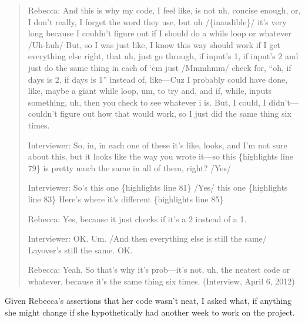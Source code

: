 \begin{quote}
  Rebecca: And this is why my code, I feel like, is not uh, concise enough, or, I don't really, I forget the word they use, but uh /\{inaudible\}/ it's very long because I couldn't figure out if I should do a while loop or whatever /Uh-huh/ But, so I was just like, I know this way should work if I get everything else right, that uh, just go through, if input's 1, if input's 2 and just do the same thing in each of `em just /Mmmhmm/ check for, ``oh, if days is 2, if days is 1'' instead of, like---Cuz I probably could have done, like, maybe a giant while loop, um, to try and, and if, while, inputs something, uh, then you check to see whatever i is. But, I could, I didn't---couldn't figure out how that would work, so I just did the same thing six times.

  Interviewer: So, in, in each one of these it's like, looks, and I'm not sure about this, but it looks like the way you wrote it---so this \{highlights line 79\} is pretty much the same in all of them, right? /Yes/

  Interviewer: So's this one \{highlights line 81\} /Yes/ this one \{highlights line 83\} Here's where it's different \{highlights line 85\}

  Rebecca: Yes, because it just checks if it's a 2 instead of a 1.

  Interviewer: OK. Um. /And then everything else is still the same/ Layover's still the same. OK.

  Rebecca: Yeah. So that's why it's prob---it's not, uh, the neatest code or whatever, because it's the same thing six times. (Interview, April 6, 2012)
\end{quote}



Given Rebecca's assertions that her code wasn't neat, I asked what, if anything she might change if she hypothetically had another week to work on the project.

